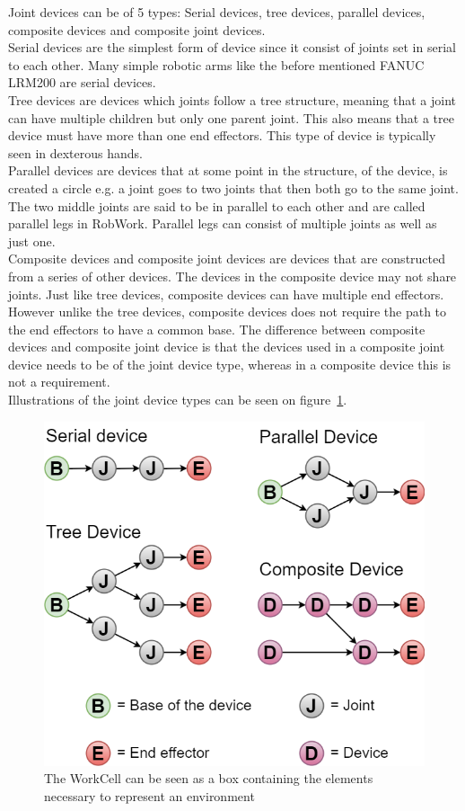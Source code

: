 Joint devices can be of 5 types: Serial devices, tree devices, parallel devices, composite devices and composite joint devices.\\
Serial devices are the simplest form of device since it consist of joints set in serial to each other. Many simple robotic arms like the before mentioned FANUC LRM200 are serial devices.\\
Tree devices are devices which joints follow a tree structure, meaning that a joint can have multiple children but only one parent joint. This also means that a tree device must have more than one end effectors. This type of device is typically seen in dexterous hands.\\
Parallel devices are devices that at some point in the structure, of the device, is created a circle e.g. a joint goes to two joints that then both go to the same joint. The two middle joints are said to be in parallel to each other and are called parallel legs in RobWork. Parallel legs can consist of multiple joints as well as just one.\\
Composite devices and composite joint devices are devices that are constructed from a series of other devices. The devices in the composite device may not share joints. Just like tree devices, composite devices can have multiple end effectors. However unlike the tree devices, composite devices does not require the path to the end effectors to have a common base. The difference between composite devices and composite joint device is that the devices used in a composite joint device needs to be of the joint device type, whereas in a composite device this is not a requirement.\\
Illustrations of the joint device types can be seen on figure~\ref{fig:DeviceTypes}.

\begin{figure}[h]
	\centering
	\includegraphics[scale=0.55]{Figures/DeviceTypes.png}
	\caption{The WorkCell can be seen as a box containing the elements necessary to represent an environment}
	\label{fig:DeviceTypes}
\end{figure}

